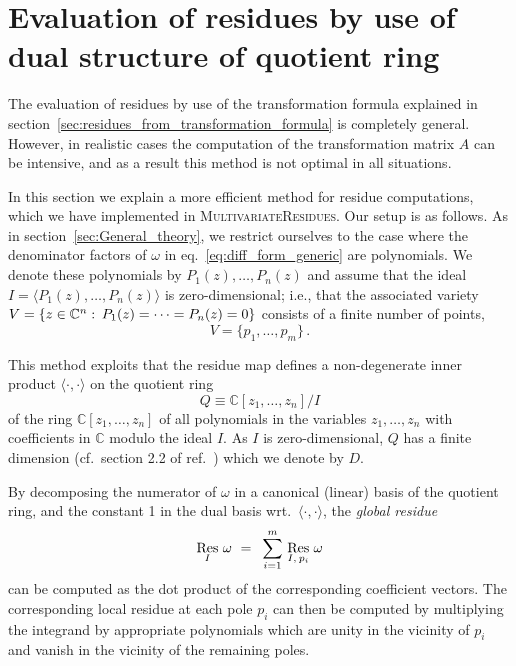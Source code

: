 \documentclass[dvipsnames,preprint,12pt,sort&compress]{elsarticle}
\begin{document}
\section{Evaluation of residues by use of dual structure of quotient ring}\label{sec:quotient_ring_duality}

The evaluation of residues by use of the transformation formula explained in
section~\ref{sec:residues_from_transformation_formula}
is completely general. However, in realistic cases the computation of
the transformation matrix $A$ can be intensive, and as a result this method
is not optimal in all situations.

In this section we explain a more efficient method for residue computations,
which we have implemented in \textsc{MultivariateResidues}. Our setup is as follows.
As in section~\ref{sec:General_theory}, we restrict ourselves to the case
where the denominator factors of $\omega$ in eq.~\eqref{eq:diff_form_generic}
are polynomials. We denote these polynomials by $P_1(z), \ldots, P_n(z)$ and
assume that the ideal $I=\langle P_1(z), \ldots, P_n(z) \rangle$ is zero-dimensional;
i.e., that the associated variety
$V = \{ z \in \mathbb{C}^n : \hspace{0.7mm} P_1(z) = \cdots = P_n(z) = 0 \}$
consists of a finite number of points,
\begin{equation}
V = \{ p_1, \ldots, p_m \} \,.
\end{equation}

This method exploits
that the residue map defines a non-degenerate inner product $\langle \cdot, \cdot \rangle$
on the quotient ring
\begin{equation}
Q \equiv \mathbb{C}[z_1, \ldots, z_n]/I
\end{equation}
of the ring $\mathbb{C}[z_1, \ldots, z_n]$ of all polynomials in the
variables $z_1, \ldots, z_n$ with coefficients in $\mathbb{C}$ modulo
the ideal $I$. As $I$ is zero-dimensional, $Q$ has a finite dimension
(cf.~section 2.2 of ref.~\cite{UsingAlgebraicGeometry}) which we denote by $D$.

By decomposing the numerator of $\omega$ in a canonical
(linear) basis of the quotient ring, and the constant 1
in the dual basis wrt.~$\langle \cdot, \cdot \rangle$,
the \emph{global residue}
\begin{equation}
\mathop{\mathrm{Res}}_I \hspace{0.5mm} \omega
\hspace{1.2mm}=\hspace{1.8mm} \sum_{i=1}^m \hspace{0.6mm} \mathop{\mathrm{Res}}_{I, \hspace{0.6mm} p_i} \hspace{0.5mm} \omega
\label{eq:global_residue_def}
\end{equation}
can be computed as the dot product of the corresponding
coefficient vectors. The corresponding local residue at each pole $p_i$
can then be computed by multiplying the integrand by appropriate polynomials
which are unity in the vicinity of $p_i$ and vanish in the vicinity of
the remaining poles.
\end{document}
